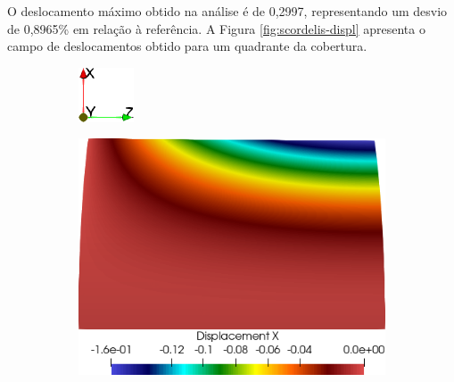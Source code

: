 O deslocamento máximo obtido na análise é de 0,2997, representando um desvio de 0,8965\% em relação à referência. A Figura \ref{fig:scordelis-displ} apresenta o campo de deslocamentos obtido para um quadrante da cobertura.

\begin{figure}[h!]
    \centering
    \caption{\textit{Scordelis-Lo roof} - Campos de deslocamentos obtidos.}
    \begin{subfigure}{0.05\textwidth}
        \includegraphics[width=\linewidth]{Figuras/scordelis/eixos.png}
    \end{subfigure}
    \begin{subfigure}{0.31\textwidth}
        \includegraphics[width=\linewidth]{Figuras/scordelis/ux.png}

\end{subfigure}
\end{figure}

